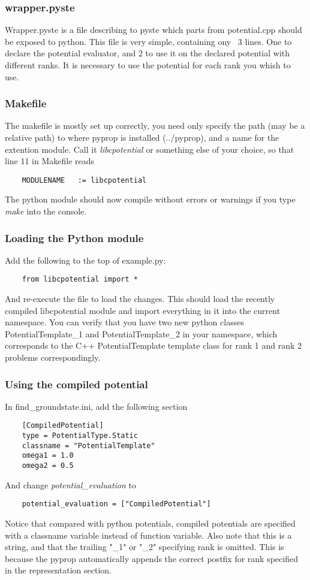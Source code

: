 \subsubsection*{wrapper.pyste}
Wrapper.pyste is a file describing to pyste which parts from potential.cpp should be exposed to python. This file is very
simple, containing ony ~3 lines. One to declare the potential evaluator, and 2 to use it on the declared potential with
different ranks. It is necessary to use the potential for each rank you whish to use. 

\subsubsection*{Makefile}
The makefile is mostly set up correctly, you need only specify the path (may be a relative path) to where pyprop 
is installed (../pyprop), and a name for the extention module. Call it \textit{libcpotential} or something else of your
choice, so that line 11 in Makefile reads
\begin{verbatim}
	MODULENAME   := libcpotential
\end{verbatim}

The python module should now compile without errors or warnings if you type \textit{make} into the console.

\subsubsection*{Loading the Python module}
Add the following to the top of example.py:
\begin{verbatim}
	from libcpotential import *
\end{verbatim}
And re-execute the file to load the changes. 
This should load the recently compiled libcpotential module and import everything in it into the current namespace.
You can verify that you have two new python classes PotentialTemplate\_1 and PotentialTemplate\_2 in your namespace, which 
corresponds to the C++ PotentialTemplate template class for rank 1 and rank 2 problems correspondingly.

\subsubsection*{Using the compiled potential}
In find\_groundstate.ini, add the following section
\begin{verbatim}
	[CompiledPotential]
	type = PotentialType.Static
	classname = "PotentialTemplate"
	omega1 = 1.0
	omega2 = 0.5
\end{verbatim}
And change \textit{potential\_evaluation} to 
\begin{verbatim}
	potential_evaluation = ["CompiledPotential"]
\end{verbatim}
Notice that compared with python potentials, compiled potentials are specified with a classname variable instead of function
variable. Also note that this is a string, and that the trailing "\_1" or "\_2" specifying rank is omitted. This is because
the pyprop automatically appends the correct postfix for rank specified in the representation section.

